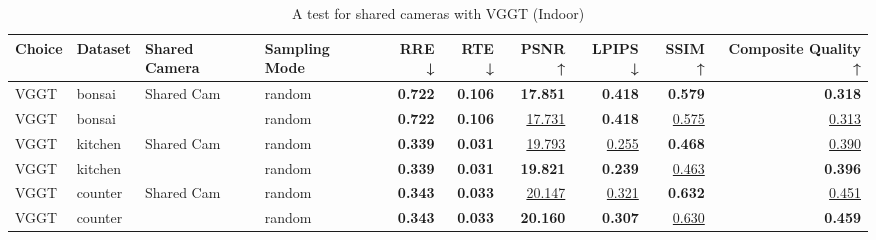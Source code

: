 \begin{table}[H]
\caption{A test for shared cameras with VGGT (Indoor)}
\label{tab:06_shared_camera_vggt_indoor}
\footnotesize
\begin{tabular}{llllrrrrrr}
\toprule
Choice & Dataset & Shared Camera & Sampling Mode & RRE ↓ & RTE ↓ & PSNR ↑ & LPIPS ↓ & SSIM ↑ & Composite Quality ↑ \\
\midrule
VGGT & bonsai & Shared Cam & random & \textbf{0.722} & \textbf{0.106} & \textbf{17.851} & \textbf{0.418} & \textbf{0.579} & \textbf{0.318} \\
VGGT & bonsai &  & random & \textbf{0.722} & \textbf{0.106} & \underline{17.731} & \textbf{0.418} & \underline{0.575} & \underline{0.313} \\
\midrule
VGGT & kitchen & Shared Cam & random & \textbf{0.339} & \textbf{0.031} & \underline{19.793} & \underline{0.255} & \textbf{0.468} & \underline{0.390} \\
VGGT & kitchen &  & random & \textbf{0.339} & \textbf{0.031} & \textbf{19.821} & \textbf{0.239} & \underline{0.463} & \textbf{0.396} \\
\midrule
VGGT & counter & Shared Cam & random & \textbf{0.343} & \textbf{0.033} & \underline{20.147} & \underline{0.321} & \textbf{0.632} & \underline{0.451} \\
VGGT & counter &  & random & \textbf{0.343} & \textbf{0.033} & \textbf{20.160} & \textbf{0.307} & \underline{0.630} & \textbf{0.459} \\
\bottomrule
\end{tabular}
\end{table}